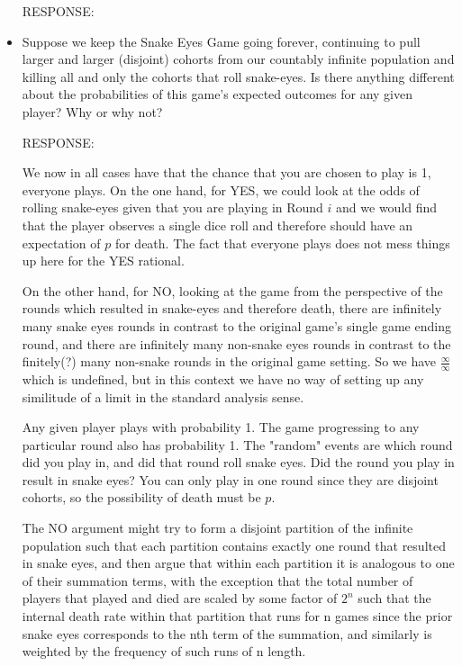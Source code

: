 \documentclass[article,twocolumn]{memoir}
\begin{document}
\begin{itemize}
    {\color{violet}
        RESPONSE: 
        
    }
\item Suppose we keep the Snake Eyes Game going forever, continuing to pull larger and larger (disjoint) cohorts from our countably infinite population and killing all and only the cohorts that roll snake-eyes. Is there anything different about the probabilities of this game’s expected outcomes for any given player? Why or why not?

    {\color{violet}
        RESPONSE: 
       
        We now in all cases have that the chance that you are chosen to play is 1, everyone plays.  On the one hand, for YES, we could look at the odds of rolling snake-eyes given that you are playing in Round $i$ and we would find that the player observes a single dice roll and therefore should have an expectation of $p$ for death.  The fact that everyone plays does not mess things up here for the YES rational.

        On the other hand, for NO, looking at the game from the perspective of the rounds which resulted in snake-eyes and therefore death, there are infinitely many snake eyes rounds in contrast to the original game's single game ending round, and there are infinitely many non-snake eyes rounds in contrast to the finitely(?) many non-snake rounds in the original game setting.  So we have $\frac{\infty}{\infty}$ which is undefined, but in this context we have no way of setting up any similitude of a limit in the standard analysis sense.

        Any given player plays with probability 1.  The game progressing to any particular round also has probability 1.  The "random" events are which round did you play in, and did that round roll snake eyes.  Did the round you play in result in snake eyes?  You can only play in one round since they are disjoint cohorts, so the possibility of death must be $p$.

        The NO argument might try to form a disjoint partition of the infinite population such that each partition contains exactly one round that resulted in snake eyes, and then argue that within each partition it is analogous to one of their summation terms, with the exception that the total number of players that played and died are scaled by some factor of $2^n$ such that the internal death rate within that partition that runs for n games since the prior snake eyes corresponds to the nth term of the summation, and similarly is weighted by the frequency of such runs of n length.
    }
\end{itemize}
\end{document}
